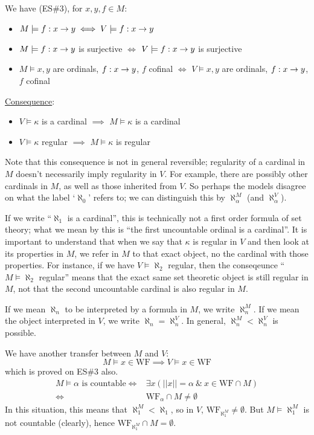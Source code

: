 \documentclass[]{article}
\newcommand{\wf}{\textrm{WF}}
\begin{document}
We have (ES\#3), for $x,y,f \in M$:
\begin{itemize}    
    \item $M\models f : x\rightarrow y \iff V\models f : x \rightarrow y$
    \item $M\models f:x\rightarrow y $ is surjective $\iff$ $V\models f:x \rightarrow y$ is surjective
    \item $M\models x,y$ are ordinals, $f : x \rightarrow y$, $f$ cofinal $\iff$ $V\models x,y$ are ordinals, $f : x \rightarrow y$, $f$ cofinal
\end{itemize}

\underline{Consequence}:
\begin{itemize}
    \item $V\models \kappa$ is a cardinal $\implies$ $M\models \kappa$ is a cardinal
    \item $V\models \kappa$ regular $\implies$ $M\models \kappa$ is regular
\end{itemize}
Note that this consequence is not in general reversible; regularity of a cardinal in $M$ doesn't necessarily imply regularity in $V$. For example, there are possibly other cardinals in $M$, as well as those inherited from $V$. So perhaps the models disagree on what the label `$\aleph_0$' refers to; we can distinguish this by $\aleph_\alpha^M$ (and $\aleph_\alpha^V$).

If we write ``$\aleph_1$ is a cardinal'', this is technically not a first order formula of set theory; what we mean by this is ``the first uncountable ordinal is a cardinal''. It is important to understand that when we say that $\kappa$ is regular in $V$ and then look at its properties in $M$, we refer in $M$ to that exact object, no the cardinal with those properties. For instance, if we have $V\models \aleph_2$ regular, then the conseqeunce ``$M\models \aleph_2$ regular'' means that the exact same set theoretic object is still regular in $M$, not that the second uncountable cardinal is also regular in $M$.

If we mean $\aleph_n$ to be interpreted by a formula in $M$, we write $\aleph_n^M$. If we mean the object interpreted in $V$, we write $\aleph_n = \aleph_n^V$. In general, $\aleph_n^M < \aleph_n^V$ is possible.

We have another transfer between $M$ and $V$: $$M\models x \in \wf \implies V \models x \in \wf$$
which is proved on ES\#3 also.
\begin{align*}
    M\models \alpha\textrm{ is countable} \iff & \exists x (||x|| = \alpha \ \& \ x \in \wf\cap M)\\
    \iff & \wf_\alpha \cap M \ne \emptyset 
\end{align*}
In this situation, this means that $\aleph_1^M < \aleph_1$, so in $V$, $\wf_{\aleph_1^M}\ne \emptyset$. But $M \models \aleph_1^M$ is not countable (clearly), hence $\wf_{\aleph_1^M}\cap M = \emptyset$.
\end{document}
